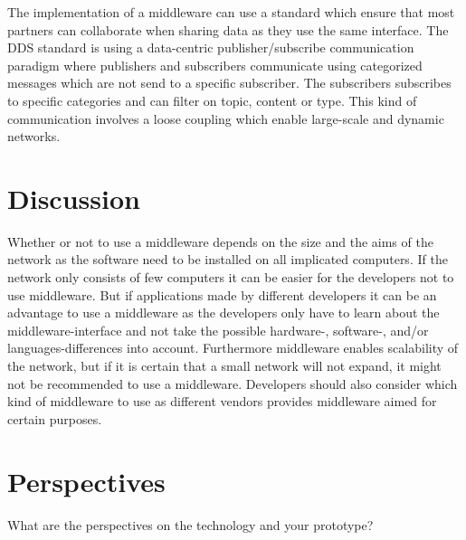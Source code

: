 \documentclass[Main]{subfiles}
\begin{document}
The implementation of a middleware can use a standard which ensure that most partners can collaborate when sharing data as they use the same interface. The DDS standard is using a data-centric publisher/subscribe communication paradigm where publishers and subscribers communicate using categorized messages which are not send to a specific subscriber. The subscribers subscribes to specific categories and can filter on topic, content or type. This kind of communication involves a loose coupling which enable large-scale and dynamic networks.

\section{Discussion}
Whether or not to use a middleware depends on the size and the aims of the network as the software need to be installed on all implicated computers. If the network only consists of few computers it can be easier for the developers not to use middleware. But if applications made by different developers it can be an advantage to use a middleware as the developers only have to learn about the middleware-interface and not take the possible hardware-, software-, and/or languages-differences into account. Furthermore middleware enables scalability of the network, but if it is certain that a small network will not expand, it might not be recommended to use a middleware. Developers should also consider which kind of middleware to use as different vendors provides middleware aimed for certain purposes. 

\section{Perspectives}
What are the perspectives on the technology and your prototype? 
\end{document}
